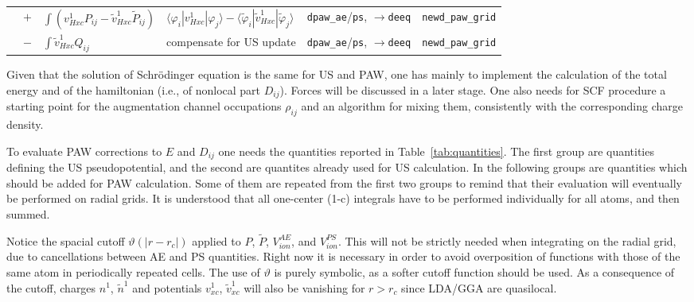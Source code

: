 \documentclass[a4paper,twocolumn,12pt]{article}
\newcommand{\var}[1]{{\tt #1}}
\renewcommand{\phi}{\varphi}
\renewcommand{\theta}{\vartheta}
\begin{document}
\begin{table*}
\begin{small}
\begin{tabular}{|c@{}c@{}l|p{4.5cm}|p{4.5cm}|p{4.0cm}|}
%
$ $ &$+$& $\int(v^1_{Hxc}P_{ij}-\tilde{v}^1_{Hxc}\tilde{P}_{ij})$ & $\langle\phi_i|v^1_{Hxc}|\phi_j\rangle-\langle\tilde{\phi}_i|\tilde{v}^1_{Hxc}|\tilde{\phi}_j\rangle$ & \var{dpaw\_ae}/\var{ps}, $\rightarrow$\var{deeq} & \var{newd\_paw\_grid}\\
%
$ $ &$-$& $\int{\tilde{v}^1_{Hxc}Q_{ij}}$ & compensate for US update & \var{dpaw\_ae}/\var{ps}, $\rightarrow$\var{deeq} & \var{newd\_paw\_grid}\\
%
\hline
\end{tabular}
\end{small}
\caption{\label{tab:quantities}Quantities needed to perform PAW
calculation on the regular grid}
\end{table*}


Given that the solution of Schr\"odinger equation is the same for US
and PAW, one has mainly to implement the calculation of the total
energy and of the hamiltonian (i.e., of nonlocal part $D_{ij}$).
Forces will be discussed in a later stage.  One also needs for SCF
procedure a starting point for the augmentation channel occupations
$\rho_{ij}$ and an algorithm for mixing them, consistently with the
corresponding charge density.

To evaluate PAW corrections to $E$ and $D_{ij}$ one needs the
quantities reported in Table~\ref{tab:quantities}.  The first group
are quantities defining the US pseudopotential, and the second are
quantites already used for US calculation.  In the following groups
are quantities which should be added for PAW calculation.  Some of
them are repeated from the first two groups to remind that their
evaluation will eventually be performed on radial grids.  It is
understood that all one-center (1-c) integrals have to be performed
individually for all atoms, and then summed.

Notice the spacial cutoff $\theta(|r-r_c|)$ applied to $P$,
$\tilde{P}$, $V^{AE}_{ion}$, and $V^{PS}_{ion}$.  This will not be
strictly needed when integrating on the radial grid, due to
cancellations between AE and PS quantities.  Right now it is necessary
in order to avoid overposition of functions with those of the same
atom in periodically repeated cells.  The use of $\theta$ is purely
symbolic, as a softer cutoff function should be used.  As a
consequence of the cutoff, charges $n^1$, $\tilde{n}^1$ and potentials
$v^1_{xc}$, $\tilde{v}^1_{xc}$ will also be vanishing for $r>r_c$
since LDA/GGA are quasilocal.
\end{document}
